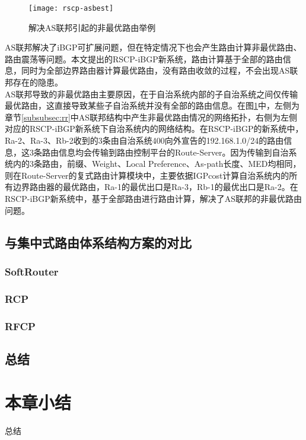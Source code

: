 \begin{figure}
  \centering
  \texttt{[image: rscp-asbest]}
  \caption{解决AS联邦引起的非最优路由举例}
  \label{fig:rscp-asbest}
\end{figure}

AS联邦解决了iBGP可扩展问题，但在特定情况下也会产生路由计算非最优路由、路由震荡等问题。本文提出的RSCP-iBGP新系统，路由计算基于全部的路由信息，同时为全部边界路由器计算最优路由，没有路由收敛的过程，不会出现AS联邦存在的隐患。\\

AS联邦导致的非最优路由主要原因，在于自治系统内部的子自治系统之间仅传输最优路由，这直接导致某些子自治系统并没有全部的路由信息。在图\ref{fig:rscp-asbest}中，左侧为章节\ref{subsubsec:rr}中AS联邦结构中产生非最优路由情况的网络拓扑，右侧为左侧对应的RSCP-iBGP新系统下自治系统内的网络结构。在RSCP-iBGP的新系统中，Ra-2、Ra-3、Rb-2收到的3条由自治系统400向外宣告的192.168.1.0/24的路由信息，这3条路由信息均会传输到路由控制平台的Route-Server。因为传输到自治系统内的3条路由，前缀、Weight、Local Preference、As-path长度、MED均相同，则在Route-Server的复式路由计算模块中，主要依据IGPcost计算自治系统内的所有边界路由器的最优路由，Ra-1的最优出口是Ra-3，Rb-1的最优出口是Ra-2。在RSCP-iBGP新系统中，基于全部路由进行路由计算，解决了AS联邦的非最优路由问题。\\



\subsection{与集中式路由体系结构方案的对比}
\subsubsection{SoftRouter}
\subsubsection{RCP}
\subsubsection{RFCP}
\subsection{总结}

\section{本章小结}
总结